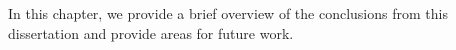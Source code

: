 In this chapter, we provide a brief overview of the conclusions from this dissertation and provide areas for future work.
